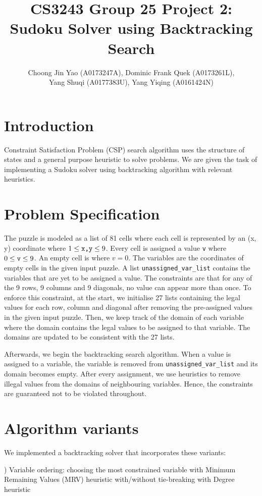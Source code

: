 \documentclass[runningheads]{llncs}
\title{CS3243 Group 25 Project 2: Sudoku Solver using Backtracking Search}
\author{Choong Jin Yao (A0173247A), Dominic Frank Quek (A0173261L),\\ Yang Shuqi (A0177383U), Yang Yiqing (A0161424N)}
\begin{document}
\maketitle

\section{Introduction}
Constraint Satisfaction Problem (CSP) search algorithm uses the structure of states and a general purpose heuristic to solve problems. We are given the task of implementing a Sudoku solver using backtracking algorithm with relevant heuristics. 

\section{Problem Specification}
The puzzle is modeled as a list of 81 cells where each cell is represented by an (x, y) coordinate where $ 1\leq \verb`x,y` \leq 9$. Every cell is assigned a value \verb`v` where  $ 0\leq \verb`v` \leq 9$. An empty cell is where $v = 0$. The variables are the coordinates of empty cells in the given input puzzle. A list \verb`unassigned_var_list` contains the variables that are yet to be assigned a value. The constraints are that for any of the 9 rows, 9 columns and 9 diagonals, no value can appear more than once. To enforce this constraint, at the start, we initialise 27 lists containing the legal values for each row, column and diagonal after removing the pre-assigned values in the given input puzzle. Then, we keep track of the domain of each variable where the domain contains the legal values to be assigned to that variable. The domains are updated to be consistent with the 27 lists. 

Afterwards, we begin the backtracking search algorithm. When a value is assigned to a variable, the variable is removed from \verb`unassigned_var_list` and its domain becomes empty. After every assignment, we use heuristics to remove illegal values from the domains of neighbouring variables. Hence, the constraints are guaranteed not to be violated throughout.

\section{Algorithm variants}
We implemented a backtracking solver that incorporates these variants: 

\indent {}) Variable ordering: choosing the most constrained variable with Minimum Remaining Values (MRV) \indent \indent heuristic with/without tie-breaking with Degree heuristic
\end{document}
